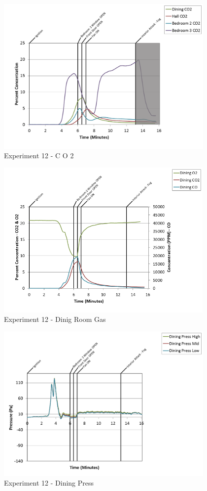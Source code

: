 \documentclass{article}
\begin{document}
\begin{appendices}
\clearpage

\begin{figure}[h!]
	\centering
	\includegraphics[height=3.05in]{0_Images/Results_Charts/Exp_12_Charts/CO2.png}
	\caption{Experiment 12 - C O 2}
\end{figure}


\begin{figure}[h!]
	\centering
	\includegraphics[height=3.05in]{0_Images/Results_Charts/Exp_12_Charts/DinigRoomGas.png}
	\caption{Experiment 12 - Dinig Room Gas}
\end{figure}

\clearpage

\begin{figure}[h!]
	\centering
	\includegraphics[height=3.05in]{0_Images/Results_Charts/Exp_12_Charts/DiningPress.png}
	\caption{Experiment 12 - Dining Press}
\end{figure}



\end{appendices}
\end{document}
